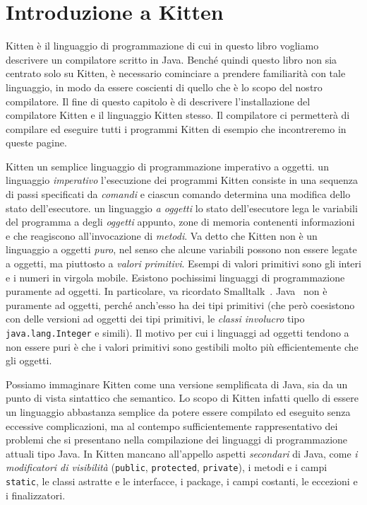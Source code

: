 \chapter{Introduzione a Kitten}\label{ch:kitten}
\begin{center}
\end{center}
%
Kitten \`e il linguaggio di programmazione di cui in questo libro
vogliamo descrivere un compilatore scritto in Java.
Bench\'e quindi questo libro non sia centrato solo su
Kitten, \`e necessario cominciare a
prendere familiarit\`a con tale linguaggio, in modo da essere
coscienti di quello che \`e lo scopo del nostro compilatore.
Il fine di questo capitolo \`e di descrivere l'installazione del compilatore
Kitten e il linguaggio Kitten stesso. Il compilatore ci permetter\`a di
compilare ed eseguire tutti i programmi Kitten
di esempio che incontreremo in queste pagine.

Kitten \e un semplice linguaggio di programmazione imperativo a oggetti.
\E un linguaggio \emph{imperativo} \poiche
l'esecuzione dei programmi Kitten consiste in una sequenza di passi
specificati da \emph{comandi} e ciascun comando determina una modifica
dello stato dell'esecutore. \E un linguaggio \emph{a oggetti} \poiche
lo stato dell'esecutore lega le variabili del programma a degli \emph{oggetti}
appunto, \cioe zone di memoria contenenti informazioni e che reagiscono
all'invocazione di \emph{metodi}. Va detto che Kitten non \`e un linguaggio
a oggetti \emph{puro}, nel senso che alcune variabili possono non essere legate
a oggetti, ma piuttosto a \emph{valori primitivi}. Esempi di valori primitivi
sono gli interi e i numeri in virgola mobile. Esistono pochissimi linguaggi di
programmazione puramente ad oggetti. In particolare, va ricordato
Smalltalk~\cite{GoldbergR89}. Java~\cite{GoslingJSB05}
non \`e puramente ad oggetti, perch\'e anch'esso ha dei tipi primitivi
(che per\`o coesistono con
delle versioni ad oggetti dei tipi primitivi, \cioe le \emph{classi
involucro} tipo \texttt{java.lang.Integer} e simili).
Il motivo per cui i linguaggi ad oggetti tendono a non essere puri
\`e che i valori primitivi sono gestibili molto pi\`u efficientemente
che gli oggetti.

Possiamo immaginare Kitten come una versione semplificata di Java,
sia da un punto di vista sintattico che semantico. Lo scopo di Kitten \e
infatti quello di essere un linguaggio abbastanza semplice da potere essere
compilato ed eseguito senza eccessive complicazioni, ma al contempo
sufficientemente rappresentativo dei problemi che si presentano nella
compilazione dei linguaggi di programmazione attuali tipo Java.
In Kitten mancano all'appello aspetti \emph{secondari} di Java, come
\emph{i modificatori di visibilit\`a} (\texttt{public}, \texttt{protected},
\texttt{private}), i metodi e i campi \texttt{static}, le classi
astratte e le interfacce, i package, i campi costanti, le eccezioni
e i finalizzatori.

